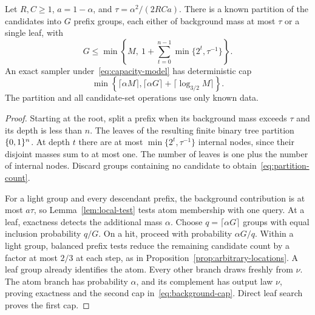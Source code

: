 \begin{lemma}\label{lem:background-partition}
Let $R,C\ge1$, $a=1-\alpha$, and $\tau=\alpha^2/(2RCa)$. There is a known partition of the candidates into $G$ prefix groups, each either of background mass at most $\tau$ or a single leaf, with
\begin{equation}\label{eq:partition-count}
 G\le \min\left\{M,\ 1+\sum_{t=0}^{n-1}\min\{2^t,\tau^{-1}\}\right\}.
\end{equation}
An exact sampler under~\eqref{eq:capacity-model} has deterministic cap
\begin{equation}\label{eq:background-cap}
 \min\left\{\lceil\alpha M\rceil,
        \lceil\alpha G\rceil+\lceil\log_{3/2}M\rceil\right\}.
\end{equation}
The partition and all candidate-set operations use only known data.
\end{lemma}
\begin{proof}
Starting at the root, split a prefix when its background mass exceeds $\tau$ and its depth is less than $n$. The leaves of the resulting finite binary tree partition $\{0,1\}^n$. At depth $t$ there are at most $\min\{2^t,\tau^{-1}\}$ internal nodes, since their disjoint masses sum to at most one. The number of leaves is one plus the number of internal nodes. Discard groups containing no candidate to obtain~\eqref{eq:partition-count}.

For a light group and every descendant prefix, the background contribution is at most $a\tau$, so Lemma~\ref{lem:local-test} tests atom membership with one query. At a leaf, exactness detects the additional mass $\alpha$. Choose $q=\lceil\alpha G\rceil$ groups with equal inclusion probability $q/G$. On a hit, proceed with probability $\alpha G/q$. Within a light group, balanced prefix tests reduce the remaining candidate count by a factor at most $2/3$ at each step, as in Proposition~\ref{prop:arbitrary-locations}. A leaf group already identifies the atom. Every other branch draws freshly from $\nu$. The atom branch has probability $\alpha$, and its complement has output law $\nu$, proving exactness and the second cap in~\eqref{eq:background-cap}. Direct leaf search proves the first cap.
\end{proof}

